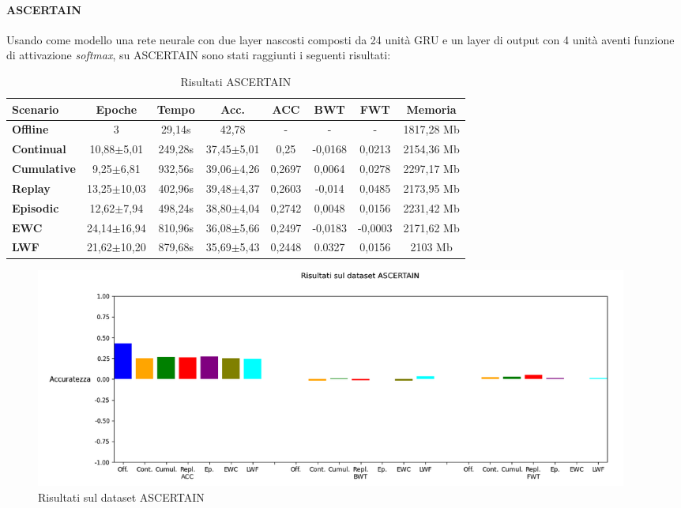 \paragraph{ASCERTAIN} Usando come modello una rete neurale con due layer nascosti composti da 24 unità GRU e un layer di output con 4 unità aventi funzione di attivazione \textit{softmax}, su ASCERTAIN sono stati raggiunti i seguenti risultati:
\begin{table}[h]
\footnotesize
    \begin{tabular}{l|c|c|c|c|c|c|c}
        \textbf{Scenario} & \textbf{Epoche} & \textbf{Tempo} & \textbf{Acc.} & \textbf{ACC} & \textbf{BWT} & \textbf{FWT} & \textbf{Memoria}\\
        \hline
         \textbf{Offline} & 3 & 29,14s & 42,78 & - & - & - & 1817,28 Mb\\
        \textbf{Continual} & 10,88$\pm$5,01 & 249,28s & 37,45$\pm$5,01 & 0,25 & -0,0168 & 0,0213 & 2154,36 Mb\\
        \textbf{Cumulative} & 9,25$\pm$6,81 & 932,56s & 39,06$\pm$4,26 & 0,2697 & 0,0064 & 0,0278 & 2297,17 Mb\\
        \textbf{Replay} & 13,25$\pm$10,03 & 402,96s & 39,48$\pm$4,37 & 0,2603 & -0,014 & 0,0485 & 2173,95 Mb\\
        \textbf{Episodic} & 12,62$\pm$7,94 & 498,24s & 38,80$\pm$4,04 & 0,2742 & 0,0048 & 0,0156 & 2231,42 Mb\\
        \textbf{EWC} & 24,14$\pm$16,94 & 810,96s & 36,08$\pm$5,66 & 0,2497 & -0,0183 & -0,0003 & 2171,62 Mb\\
        \textbf{LWF} & 21,62$\pm$10,20 & 879,68s & 35,69$\pm$5,43 & 0,2448 & 0.0327 & 0,0156 & 2103 Mb\\
    \end{tabular}
    \caption{Risultati ASCERTAIN}
    \label{tab:resascertain}
\end{table}
\begin{figure}[h]
	\begin{center}
		\includegraphics[width=0.95\textwidth]{img/graphs/ascertain_final_metrics.png}
		\caption{Risultati sul dataset ASCERTAIN}
		\label{fig:ascertain_metrics_graph}
	\end{center}
\end{figure}

